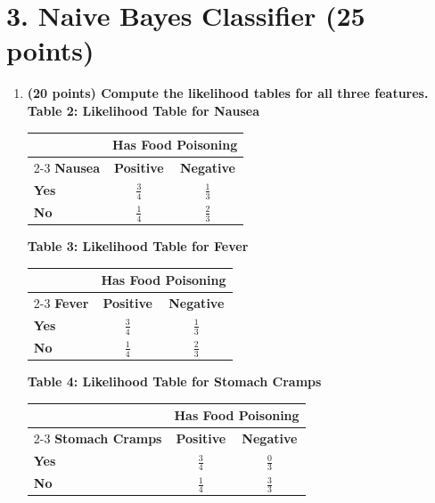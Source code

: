 \documentclass[12pt]{article}
\begin{document}
\newpage
\section*{3. Naive Bayes Classifier (25 points)}

\begin{enumerate}[label=(\alph*)]
    \item \textbf{(20 points) Compute the likelihood tables for all three features.}
    \\
    
    \textbf{Table 2: Likelihood Table for Nausea}
    \begin{center}
    \begin{tabular}{lcc}
        \toprule
        & \multicolumn{2}{c}{\textbf{Has Food Poisoning}} \\
        \cmidrule(lr){2-3}
        \textbf{Nausea} & \textbf{Positive} & \textbf{Negative} \\
        \midrule
        \textbf{Yes} & $\frac{3}{4}$ & $\frac{1}{3}$ \\
        \textbf{No}  & $\frac{1}{4}$ & $\frac{2}{3}$ \\
        \bottomrule
    \end{tabular}
    \end{center}

    \vspace{1em}
    \textbf{Table 3: Likelihood Table for Fever}
    \begin{center}
    \begin{tabular}{lcc}
        \toprule
        & \multicolumn{2}{c}{\textbf{Has Food Poisoning}} \\
        \cmidrule(lr){2-3}
        \textbf{Fever} & \textbf{Positive} & \textbf{Negative} \\
        \midrule
        \textbf{Yes} & $\frac{3}{4}$ & $\frac{1}{3}$ \\
        \textbf{No}  & $\frac{1}{4}$ & $\frac{2}{3}$ \\
        \bottomrule
    \end{tabular}
    \end{center}

    \vspace{1em}
    \textbf{Table 4: Likelihood Table for Stomach Cramps}
    \begin{center}
    \begin{tabular}{lcc}
        \toprule
        & \multicolumn{2}{c}{\textbf{Has Food Poisoning}} \\
        \cmidrule(lr){2-3}
        \textbf{Stomach Cramps} & \textbf{Positive} & \textbf{Negative} \\
        \midrule
        \textbf{Yes} & $\frac{3}{4}$ & $\frac{0}{3}$ \\
        \textbf{No}  & $\frac{1}{4}$ & $\frac{3}{3}$ \\
        \bottomrule
    \end{tabular}
    \end{center}


\end{enumerate}
\end{document}
